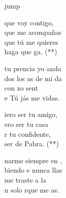 \begin{cancion}jump\\
	\begin{chorus}%
		 que voy contigo, \\
		 que me acompañas \\
		 que tú me quieres \\
		haga  que ga. (**)\jump\\
	\end{chorus}%
	 tu prencia yo anda \\
	dos los as de mi da \\
	con zo sent\\
	e Tú jás me vidas.\jump\\
	\begin{chorus}%
		iero ser tu amigo,\\
		ero ser tu casa\\
		r tu confidente,\\
		ser de  Pabra. (**)\jump\\
	\end{chorus}%
	narme siempre en , \\
	biendo e nunca llas\\
	me traste a la \\
	n solo rque me as.\\
\end{cancion}%

